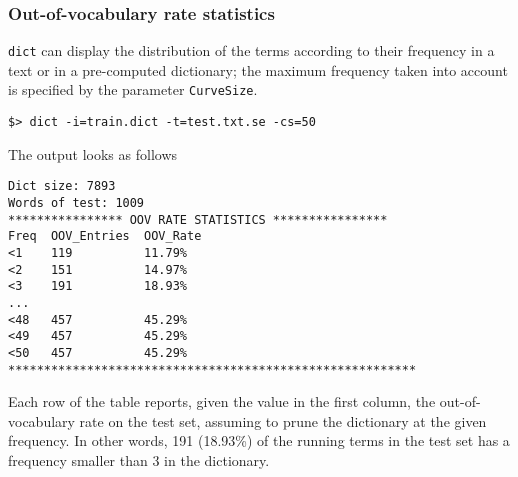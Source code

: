 \subsubsection{Out-of-vocabulary rate statistics}
{\tt dict} can display the distribution of the terms according to their frequency in a text or in a pre-computed dictionary; the maximum frequency taken into account is specified by the parameter {\tt CurveSize}.
\begin{verbatim}
$> dict -i=train.dict -t=test.txt.se -cs=50
\end{verbatim}

\noindent
The output looks as follows
\begin{verbatim}
Dict size: 7893
Words of test: 1009
**************** OOV RATE STATISTICS ****************
Freq  OOV_Entries  OOV_Rate
<1    119          11.79%
<2    151          14.97%
<3    191          18.93%
...
<48   457          45.29%
<49   457          45.29%
<50   457          45.29%
*********************************************************

\end{verbatim}
\noindent
Each row of the table reports, given the value in the first column, the out-of-vocabulary rate on the test set, assuming to prune the dictionary at the given frequency. In other words, 191 (18.93\%) of the running terms in the test set has a frequency smaller than 3 in the dictionary.
